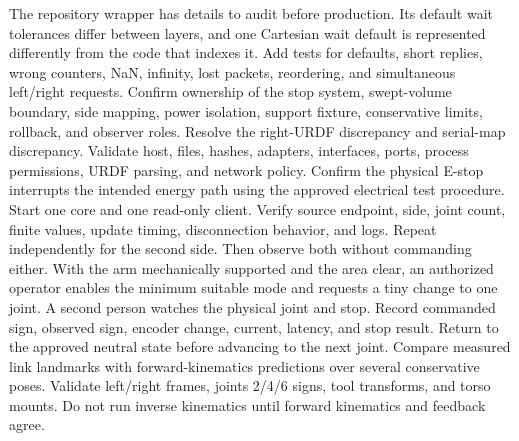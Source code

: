 {}The repository wrapper has details to audit before production. Its default wait tolerances differ between layers, and one Cartesian wait default is represented differently from the code that indexes it. Add tests for defaults, short replies, wrong counters, NaN, infinity, lost packets, reordering, and simultaneous left/right requests.\markdownRendererInterblockSeparator
{}
\markdownRendererSectionEnd \markdownRendererSectionBegin
{}\markdownRendererInterblockSeparator
{}\markdownRendererSectionBegin
{}\markdownRendererInterblockSeparator
{}Confirm ownership of the stop system, swept-volume boundary, side mapping, power isolation, support fixture, conservative limits, rollback, and observer roles. Resolve the right-URDF discrepancy and serial-map discrepancy.\markdownRendererInterblockSeparator
{}
\markdownRendererSectionEnd \markdownRendererSectionBegin
{}\markdownRendererInterblockSeparator
{}Validate host, files, hashes, adapters, interfaces, ports, process permissions, URDF parsing, and network policy. Confirm the physical E-stop interrupts the intended energy path using the approved electrical test procedure.\markdownRendererInterblockSeparator
{}
\markdownRendererSectionEnd \markdownRendererSectionBegin
{}\markdownRendererInterblockSeparator
{}Start one core and one read-only client. Verify source endpoint, side, joint count, finite values, update timing, disconnection behavior, and logs. Repeat independently for the second side. Then observe both without commanding either.\markdownRendererInterblockSeparator
{}
\markdownRendererSectionEnd \markdownRendererSectionBegin
{}\markdownRendererInterblockSeparator
{}With the arm mechanically supported and the area clear, an authorized operator enables the minimum suitable mode and requests a tiny change to one joint. A second person watches the physical joint and stop. Record commanded sign, observed sign, encoder change, current, latency, and stop result. Return to the approved neutral state before advancing to the next joint.\markdownRendererInterblockSeparator
{}
\markdownRendererSectionEnd \markdownRendererSectionBegin
{}\markdownRendererInterblockSeparator
{}Compare measured link landmarks with forward-kinematics predictions over several conservative poses. Validate left/right frames, joints 2/4/6 signs, tool transforms, and torso mounts. Do not run inverse kinematics until forward kinematics and feedback agree.\markdownRendererInterblockSeparator
